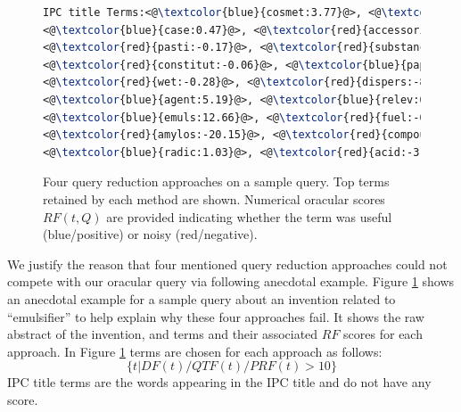 \begin{figure}[htpb]
\begin{framed}
\begin{lstlisting}[basicstyle=\small\ttfamily , linewidth=\columnwidth,breaklines=true, language=TeX]
IPC title Terms:<@\textcolor{blue}{cosmet:3.77}@>, <@\textcolor{blue}{toilet:0.18}@>, <@\textcolor{red}{prepar:-0.82}@>, 
<@\textcolor{blue}{case:0.47}@>, <@\textcolor{red}{accessori:-0.01}@>, <@\textcolor{red}{store:-0.37}@>, <@\textcolor{blue}{handl:0.07}@>, 
<@\textcolor{red}{pasti:-0.17}@>, <@\textcolor{red}{substanc:-1.21}@>, <@\textcolor{red}{fibrou:-0.01}@>, <@\textcolor{red}{pulp:-1.28}@>, 
<@\textcolor{red}{constitut:-0.06}@>, <@\textcolor{blue}{paper:1.26}@>, <@\textcolor{red}{impregn:-0.11}@>, <@\textcolor{blue}{emulsifi:6.72}@>, 
<@\textcolor{red}{wet:-0.28}@>, <@\textcolor{red}{dispers:-8.66}@>, <@\textcolor{red}{foam:-0.49}@>, <@\textcolor{red}{produc:-0.57}@>, 
<@\textcolor{blue}{agent:5.19}@>, <@\textcolor{blue}{relev:0.18}@>, <@\textcolor{blue}{class:0.053}@>, <@\textcolor{red}{lubric:-0.38}@>, 
<@\textcolor{blue}{emuls:12.66}@>, <@\textcolor{red}{fuel:-0.011}@>, <@\textcolor{blue}{deriv:11.97}@>, <@\textcolor{blue}{starch:14.64}@>, 
<@\textcolor{red}{amylos:-20.15}@>, <@\textcolor{red}{compound:-0.63}@>, <@\textcolor{red}{saccharid:-11.95}@>, 
<@\textcolor{blue}{radic:1.03}@>, <@\textcolor{red}{acid:-3.19}@> 
 \end{lstlisting} 
 \vspace*{-2ex}
\end{framed}
 \vspace*{-2ex}
  \caption{Four query reduction approaches on a sample query.  Top
    terms retained by each method are shown.  Numerical oracular
    scores $\mathit{RF}(t,Q)$ are provided indicating whether the term
    was useful (blue/positive) or noisy (red/negative).}
  \label{fig:anecdotal}  
\end{figure}

We justify the reason that four mentioned query reduction approaches could not compete with our oracular query via following anecdotal example. 
Figure \ref{fig:anecdotal} shows an anecdotal example for a sample query about an invention related to ``emulsifier'' to help explain why these four approaches fail. It shows the raw abstract of the invention, and terms and their associated $\mathit{RF}$ scores for each approach. In Figure \ref{fig:anecdotal} terms are chosen for each approach  as follows: 
\begin{displaymath}\{t| DF(t)/QTF(t)/PRF(t)>10\}\end{displaymath}
IPC title terms are the words appearing in the IPC title and do not have any score.

